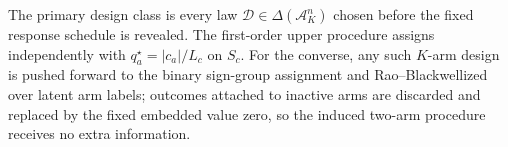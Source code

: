 The primary design class is every law \(\mathcal D\in\Delta(\mathcal A_K^n)\) chosen before the fixed response schedule is revealed.  The first-order upper procedure assigns independently with \(q_a^\star=|c_a|/L_c\) on \(S_c\).  For the converse, any such \(K\)-arm design is pushed forward to the binary sign-group assignment and Rao--Blackwellized over latent arm labels; outcomes attached to inactive arms are discarded and replaced by the fixed embedded value zero, so the induced two-arm procedure receives no extra information.